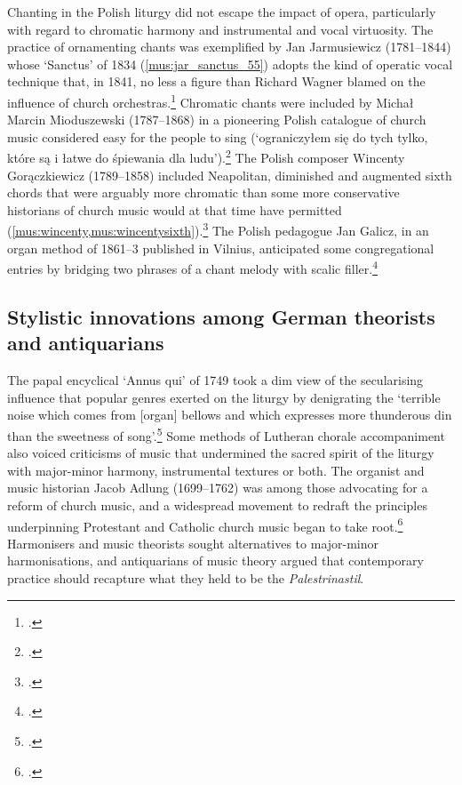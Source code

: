 Chanting in the Polish liturgy did not escape the impact of opera, particularly with regard to chromatic harmony and instrumental and vocal virtuosity.
The practice of ornamenting chants was exemplified by Jan Jarmusiewicz (1781--1844) whose `Sanctus' of 1834 (\cref{mus:jar_sanctus_55}) adopts the kind of operatic vocal technique that, in 1841, no less a figure than Richard Wagner blamed on the influence of church orchestras.\footcites[55]{JarmusiewiczChoralgregoryanskirytualny1834}[pp.~70--72 and `Notenbeilage' XVI]{WagenerBegleitunggregorianischenChorals1964}[Wagner's essay was published some thirty years after it was written in][337]{WagnerEntwurfzurOrganisation1871}[See also its translation in][341]{WagnerPlanOrganisationGerman1966}
Chromatic chants were included by Michał Marcin Mioduszewski (1787--1868) in a pioneering Polish catalogue of church music considered easy for the people to sing (`ograniczyłem się do tych tylko, które są i łatwe do śpiewania dla ludu').\footcite[pp.~5, 142]{MioduszewskiSpiewnikkoscielnyczyli1838}
The Polish composer Wincenty Gorączkiewicz (1789--1858) included Neapolitan, diminished and augmented sixth chords that were arguably more chromatic than some more conservative historians of church music would at that time have permitted (\cref{mus:wincenty,mus:wincentysixth}).\footcite[6, 13]{GoraczkiewiczSpiewychoralnekosciola1847}
The Polish pedagogue Jan Galicz, in an organ method of 1861--3 published in Vilnius, anticipated some congregational entries by bridging two phrases of a chant melody with scalic filler.\footcite[9--13, 21]{GaliczSzkolanaorgany1861}


\subsection{Stylistic innovations among German theorists and antiquarians}
The papal encyclical `Annus qui' of 1749 took a dim view of the secularising influence that popular genres exerted on the liturgy by denigrating the `terrible noise which comes from [organ] bellows and which expresses more thunderous din than the sweetness of song'.\footcite[96]{HayburnPapalLegislationSacred1979}
%
Some methods of Lutheran chorale accompaniment also voiced criticisms of music that undermined the sacred spirit of the liturgy with major-minor harmony, instrumental textures or both.
The organist and music historian Jacob Adlung (1699--1762) was among those advocating for a reform of church music, and a widespread movement to redraft the principles underpinning Protestant and Catholic church music began to take root.\footcites[681--82]{AdlungAnleitungmusikalischenGelahrtheit1758}[159--60]{GravePraiseHarmonyTeachings1987}
Harmonisers and music theorists sought alternatives to major-minor harmonisations, and antiquarians of music theory argued that contemporary practice should recapture what they held to be the \emph{Palestrinastil}.

